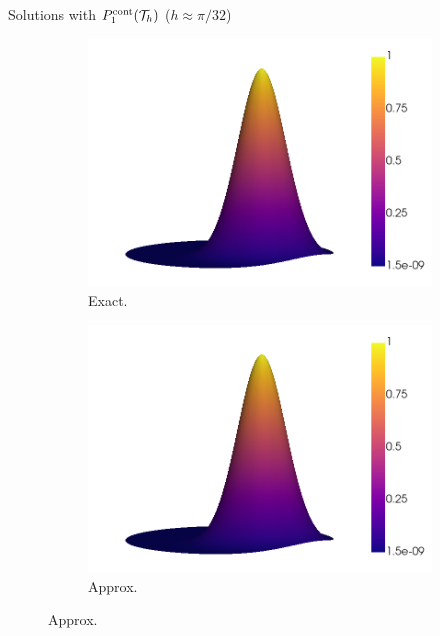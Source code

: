 	\begin{frame}{Solutions with $\relax{P}^{\text{cont}}_1(\mathcal{T}_h)$ ($h\approx \pi/32$)}
		\begin{figure}[h!]
			\begin{subfigure}{0.49\textwidth}
				\centering
				\includegraphics[scale=0.23]{img/Conveccion_Reaccion/weak/conv_react_u_ex_nx-64.png}
				\caption{Exact.}
			\end{subfigure}
			\begin{subfigure}{0.49\textwidth}
				\centering
				\includegraphics[scale=0.23]{img/Conveccion_Reaccion/weak/conv_react_u_FE_nx-64.png}
				\caption{Approx.}
			\end{subfigure}
		\end{figure}
		\end{frame}
